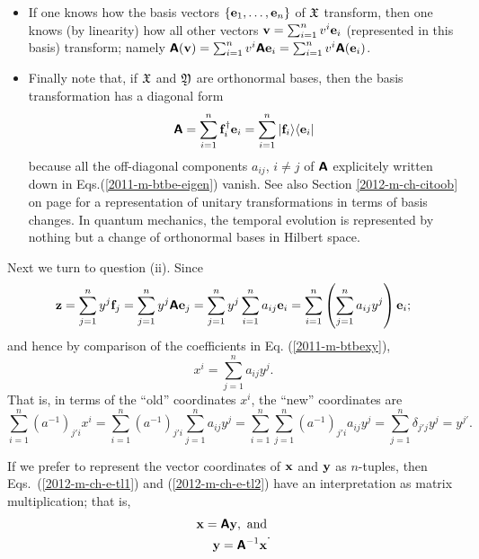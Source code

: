 \begin{itemize}
\item
If one knows how the basis vectors
$
\{
{\bf e}_1,
\ldots ,
{\bf e}_n
\}$ of ${\frak X}$    transform, then one knows (by linearity) how
all other vectors
${\bf v}=
\sum_{i=1}^n v^i{\bf e}_i
$
(represented in this basis) transform; namely
$\textsf{\textbf{A}}({\bf v})=
\sum_{i=1}^n v^i \textsf{\textbf{A}}{\bf e}_i =
\sum_{i=1}^n v^i \textsf{\textbf{A}}({\bf e}_i)
$.

\item
Finally note that, if  ${\frak X}$ and
${\frak Y}$ are orthonormal bases,
then the basis transformation has a diagonal form
\begin{equation}
\textsf{\textbf{A}} =   \sum_{i=1}^n  {\bf f}_i^\dagger  {\bf e}_i
=
\sum_{i=1}^n \vert {\bf f}_i \rangle \langle {\bf e}_i \vert
\end{equation}
because all the off-diagonal components $a_{ij}$, $i\neq j$ of $\textsf{\textbf{A}}$
explicitely written down in Eqs.(\ref{2011-m-btbe-eigen}) vanish.
See also Section
\ref{2012-m-ch-citoob} on page \pageref{2012-m-ch-citoob}
for a representation of unitary transformations in terms of basis changes.
In quantum mechanics, the temporal evolution is represented by nothing but a change of orthonormal bases in Hilbert space.
\end{itemize}

Next we turn to question (ii). Since
$${\bf z} =
 \sum_{j=1}^n y^j {\bf f}_j=
 \sum_{j=1}^n  y^j \textsf{\textbf{A}}{\bf e}_j=
 \sum_{j=1}^n  y^j  \sum_{i=1}^n a_{ij}{\bf e}_i=
  \sum_{i=1}^n \left(\sum_{j=1}^n  a_{ij}y^j \right)   {\bf e}_i;
$$
and hence by comparison of the coefficients in Eq. (\ref{2011-m-btbexy}),
\begin{equation}
x^i= \sum_{j=1}^n  a_{ij}y^j.
\label{2012-m-ch-e-tl1}
\end{equation}
That is, in terms of the ``old'' coordinates $x^i$,
the ``new'' coordinates are
\begin{equation}
\sum_{i=1}^n (a^{-1})_{j' i} x^i= \sum_{i=1}^n (a^{-1})_{j' i}\sum_{j=1}^n  a_{ij}y^j
=  \sum_{i=1}^n \sum_{j=1}^n (a^{-1})_{j' i} a_{ij}y^j
=   \sum_{j=1}^n \delta_{j' j}y^j
=  y^{j'}
.
\label{2012-m-ch-e-tl2}
\end{equation}

If we prefer to represent the vector coordinates of
${\bf x}$ and ${\bf y}$ as $n$-tuples,
then Eqs.~(\ref{2012-m-ch-e-tl1})  and (\ref{2012-m-ch-e-tl2})
have an interpretation as matrix multiplication; that is,
\begin{equation}
\begin{split}
{\bf x} =  \textsf{\textbf{A}}{\bf y}, {\textrm{ and}} \\
{\bf y} =  \textsf{\textbf{A}}^{-1}{\bf x}
\end{split}
.
\label{2012-m-ch-e-tl3}
\end{equation}

